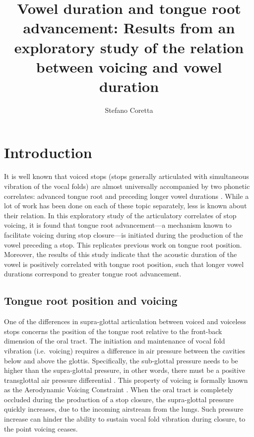 \documentclass[12pt,]{article}
\title{Vowel duration and tongue root advancement: Results from an exploratory
study of the relation between voicing and vowel duration}
\author{Stefano Coretta}
\date{}
\begin{document}
\maketitle

\hypertarget{introduction}{%
\section{Introduction}\label{introduction}}

It is well known that voiced stops (stops generally articulated with
simultaneous vibration of the vocal folds) are almost universally
accompanied by two phonetic correlates: advanced tongue root and
preceding longer vowel durations
\citep{westbury1983, lisker1974, fowler1992}. While a lot of work has
been done on each of these topic separately, less is known about their
relation. In this exploratory study of the articulatory correlates of
stop voicing, it is found that tongue root advancement---a mechanism
known to facilitate voicing during stop closure---is initiated during
the production of the vowel preceding a stop. This replicates previous
work on tongue root position. Moreover, the results of this study
indicate that the acoustic duration of the vowel is positively
correlated with tongue root position, such that longer vowel durations
correspond to greater tongue root advancement.

\hypertarget{tongue-root-position-and-voicing}{%
\subsection{Tongue root position and
voicing}\label{tongue-root-position-and-voicing}}

One of the differences in supra-glottal articulation between voiced and
voiceless stops concerns the position of the tongue root relative to the
front-back dimension of the oral tract. The initiation and maintenance
of vocal fold vibration (i.e.~voicing) requires a difference in air
pressure between the cavities below and above the glottis. Specifically,
the sub-glottal pressure needs to be higher than the supra-glottal
pressure, in other words, there must be a positive transglottal air
pressure differential \citep{berg1958, rothenberg1967}. This property of
voicing is formally known as the Aerodynamic Voicing Constraint
\citep{ohala2011}. When the oral tract is completely occluded during the
production of a stop closure, the supra-glottal pressure quickly
increases, due to the incoming airstream from the lungs. Such pressure
increase can hinder the ability to sustain vocal fold vibration during
closure, to the point voicing ceases.
\end{document}
